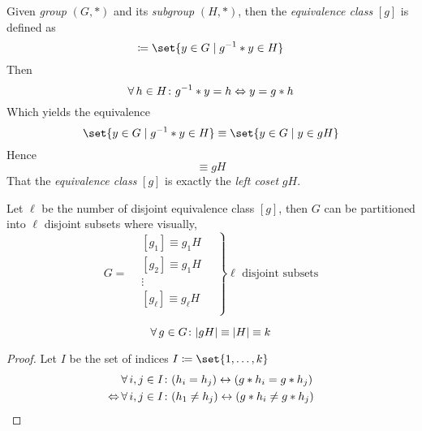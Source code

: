 \begin{definition}
    Given \textit{group} $(G, \ast)$ and its \textit{subgroup} $(H, \ast)$, then the \textit{equivalence class} $[g]$ is defined as
    \begin{equation}
        [g] \coloneqq \set{y \in G \mid \Inverse{g} \ast y \in H}
    \end{equation}
    Then
    \begin{equation}
        \operatorname{\forall} h \in H \colon {g}^{-1} \ast y = h \Leftrightarrow y = g \ast h
    \end{equation}
    Which yields the equivalence
    \begin{equation}
        \set{y \in G \mid \Inverse{g} \ast y \in H} \equiv \set{y \in G \mid y \in gH}
    \end{equation}
    Hence
    \begin{equation}
        [g] \equiv gH
    \end{equation}
    That the \textit{equivalence class} $[g]$ is exactly the \textit{left coset} $gH$.
    
    Let $\ell$ be the number of disjoint equivalence class $[g]$, then $G$ can be partitioned into $\ell$ disjoint subsets where visually,
    \begin{equation}
        G = \left. \begin{matrix}
            &\boxed{ [g_1] \equiv g_1 H } \\
            &\boxed{ [g_2] \equiv g_1 H } \\
            &\vdots \\
            &\boxed{ [g_\ell] \equiv g_\ell H } \\
        \end{matrix} \quad \right\} \ell \text{ disjoint subsets}
    \end{equation}
\end{definition}

\begin{proposition}
    \begin{equation}
        \operatorname{\forall} g \in G \colon \lvert gH \rvert \equiv \lvert H \rvert \equiv k
    \end{equation}
\end{proposition}

\begin{proof}
    Let $I$ be the set of indices $I \coloneqq \set{1, \dots, k}$
    \begin{align}
        &\operatorname{\forall} i, j \in I \colon (h_i = h_j) \leftrightarrow (g \ast h_i = g \ast h_j) \\
        \Leftrightarrow &\operatorname{\forall} i, j \in I \colon (h_1 \ne h_j) \leftrightarrow  (g \ast h_i \ne g \ast h_j)
    \end{align}
\end{proof}